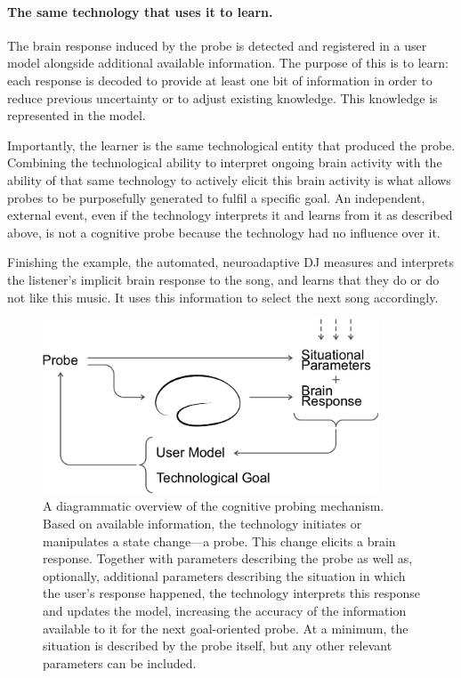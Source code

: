 \paragraph{The same technology that uses it to learn.} The brain response induced by the probe is detected and registered in a user model alongside additional available information. The purpose of this is to learn: each response is decoded to provide at least one bit of information in order to reduce previous uncertainty or to adjust existing knowledge. This knowledge is represented in the model.

Importantly, the learner is the same technological entity that produced the probe. Combining the technological ability to interpret ongoing brain activity with the ability of that same technology to actively elicit this brain activity is what allows probes to be purposefully generated to fulfil a specific goal. An independent, external event, even if the technology interprets it and learns from it as described above, is not a cognitive probe because the technology had no influence over it. 

Finishing the example, the automated, neuroadaptive DJ measures and interprets the listener's implicit brain response to the song, and learns that they do or do not like this music. It uses this information to select the next song accordingly.

\begin{figure}[t]
    \centering
    \includegraphics[width=10cm]{figures/cp-diagram.pdf}
    \caption[Diagrammatic overview of the cognitive probing mechanism.]{A diagrammatic overview of the cognitive probing mechanism. Based on available information, the technology initiates or manipulates a state change---a probe. This change elicits a brain response. Together with parameters describing the probe as well as, optionally, additional parameters describing the situation in which the user's response happened, the technology interprets this response and updates the model, increasing the accuracy of the information available to it for the next goal-oriented probe. At a minimum, the situation is described by the probe itself, but any other relevant parameters can be included.}
    \label{fig:cp:diagram}
\end{figure}

